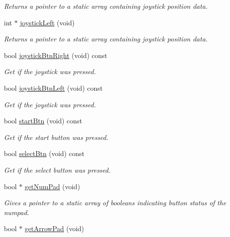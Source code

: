 \begin{DoxyCompactItemize}
\begin{DoxyCompactList}\small\item\em Returns a pointer to a static array containing joystick position data. \end{DoxyCompactList}\item 
int $\ast$ \hyperlink{class_controller_a98b5d8b11463780ac75d90fed3bd627d}{joystick\+Left} (void)
\begin{DoxyCompactList}\small\item\em Returns a pointer to a static array containing joystick position data. \end{DoxyCompactList}\item 
bool \hyperlink{class_controller_a16a17aa8cb91dc02c04648c04202b0bc}{joystick\+Btn\+Right} (void) const
\begin{DoxyCompactList}\small\item\em Get if the joystick was pressed. \end{DoxyCompactList}\item 
bool \hyperlink{class_controller_a64e858b7a8d6add4caf751887ea35a42}{joystick\+Btn\+Left} (void) const
\begin{DoxyCompactList}\small\item\em Get if the joystick was pressed. \end{DoxyCompactList}\item 
bool \hyperlink{class_controller_a79a29dd5d92150135f2abbfa01b082dc}{start\+Btn} (void) const
\begin{DoxyCompactList}\small\item\em Get if the start button was pressed. \end{DoxyCompactList}\item 
bool \hyperlink{class_controller_a366ce47c27b1a02e9e1b2ad5840e78df}{select\+Btn} (void) const
\begin{DoxyCompactList}\small\item\em Get if the select button was pressed. \end{DoxyCompactList}\item 
bool $\ast$ \hyperlink{class_controller_a8429931cf41ef4426057b153f4e4d08a}{get\+Num\+Pad} (void)
\begin{DoxyCompactList}\small\item\em Gives a pointer to a static array of booleans indicating button status of the numpad. \end{DoxyCompactList}\item 
bool $\ast$ \hyperlink{class_controller_a3f3c5959101f909d3ff951a6b9cf77ee}{get\+Arrow\+Pad} (void)

\end{DoxyCompactItemize}
